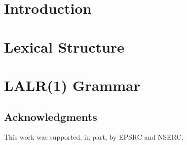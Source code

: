 \documentclass[11pt]{article}
\title{\mytitle}
\author{\myauthors}
\def\myack{This work was supported, in part, by EPSRC and NSERC.}
\begin{document}
\maketitle

\section{Introduction \label{INTRODUCTION}}


\section{Lexical Structure \label{LEXICAL}}


\section{LALR(1) Grammar \label{GRAMMAR}}


\subsection*{Acknowledgments}
\myack



\end{document}
